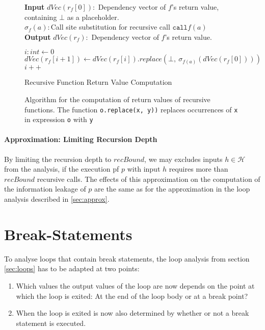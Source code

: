 \begin{figure}
    \centering
    \begin{algorithm}[H]
    \hspace*{\algorithmicindent} \textbf{Input} $dVec(r_f[0]):$ Dependency vector of $f$'s return value, \\
    \hspace*{\algorithmicindent} \hspace*{\algorithmicindent} containing $\bot$ as a placeholder.\\
    \hspace*{\algorithmicindent} \hspace*{\algorithmicindent} $\sigma_f(a): $Call site substitution for recursive call $\mathtt{call} f(a)$ \\
    \hspace*{\algorithmicindent} \textbf{Output} $dVec(r_f):$ Dependency vector of $f$'s return value.\\
    
    \begin{algorithmic}[1]
        \State $i: int \leftarrow 0$
            \State $dVec(r_f[i + 1]) \leftarrow dVec(r_f[i]).replace(\bot, \: \sigma_{f(a)}(dVec(r_f[0])))$
            \State $i++$
        \EndWhile
        \end{algorithmic}
\caption{Recursive Function Return Value Computation}
\end{algorithm}
    \caption{Algorithm for the computation of return values of recursive functions. The function \texttt{o.replace(x, y))} replaces occurrences of \texttt{x} in expression \texttt{o} with \texttt{y}}\label{alg:rec}
\end{figure}

\paragraph{Approximation: Limiting Recursion Depth}
By limiting the recursion depth to $recBound$, we may excludes inputs $h \in \mathcal{H}$ from the analysis, if the execution pf $p$ with input $h$ requires more than $recBound$ recursive calls. The effects of this approximation on the computation of the information leakage of $p$ are the same as for the approximation in the loop analysis described in \ref{sec:approx}.

\section{Break-Statements}
To analyse loops that contain break statements, the loop analysis from section \ref{sec:loops} has to be adapted at two points:
\begin{enumerate}
    \item Which values the output values of the loop are now depends on the point at which the loop is exited: At the end of the loop body or at a break point?
    \item When the loop is exited is now also determined by whether or not a break statement is executed.
\end{enumerate}

